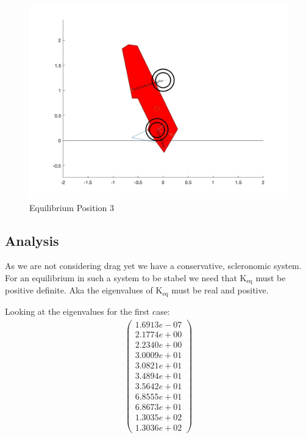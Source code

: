 \begin{figure}[ht]
    \centering
    \includegraphics[scale=0.235]{images/Equilibrium3.jpg}
    \caption{Equilibrium Position 3}
    \label{fig:eq_3}
\end{figure}

\subsection{Analysis}
As we are not considering drag yet we have a conservative, scleronomic system. For an equilibrium in such a system to be stabel we need that $\text{K}_{\text{eq}}$ must be positive definite. Aka the eigenvalues of $\text{K}_{\text{eq}}$ must be real and positive.

Looking at the eigenvalues for the first case:
\begin{equation}\label{eq:normal_eigenfrequencies}
    \begin{split}
        \begin{pmatrix}
            1.6913e-07\\
            2.1774e+00\\
            2.2340e+00\\
            3.0009e+01\\
            3.0821e+01\\
            3.4894e+01\\
            3.5642e+01\\
            6.8555e+01\\
            6.8673e+01\\
            1.3035e+02\\
            1.3036e+02
        \end{pmatrix}
    \end{split}
\end{equation}

